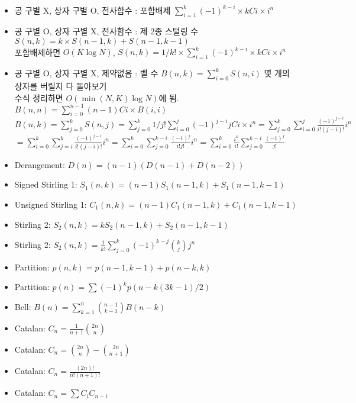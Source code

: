 \documentclass[landscape, 8pt, a4paper, oneside]{extarticle} %
\begin{document}
\begin{multicols*}{3}
\begin{itemize}
\item 공 구별 X, 상자 구별 O, 전사함수 : 포함배제 $\sum_{i=1}^{k} (-1)^{k-i} \times kCi \times i^n$
\item 공 구별 O, 상자 구별 X, 전사함수 : 제 2종 스털링 수 $S(n,k)=k\times S(n-1,k) + S(n-1, k-1)$\\
포함배제하면 $O(K \log N)$, $S(n,k) = 1/k! \times \sum_{i=1}^{k} (-1)^{k-i} \times kCi \times i^n$
\item 공 구별 O, 상자 구별 X, 제약없음 : 벨 수 $B(n,k) = \sum_{i=0}^{k} S(n,i)$ 몇 개의 상자를 버릴지 다 돌아보기\\
수식 정리하면 $O(\min(N,K)\log N)$에 됨. $B(n,n) = \sum_{i=0}^{n-1} (n-1)Ci \times B(i,i)$\\
$B(n,k)=\sum_{j=0}^{k}S(n,j) = \sum_{j=0}^{k} 1/j! \sum_{i=0}^{j} (-1)^{j-i} jCi \times i^n=\sum_{j=0}^{k}\sum_{i=0}^{j} \frac{(-1)^{j-i}}{i!(j-i)!}i^n$\\
$=\sum_{i=0}^{k}\sum_{j=i}^{k}\frac{(-1)^{j-i}}{i!(j-i)!}i^n = \sum_{i=0}^{k}\sum_{j=0}^{k-i}\frac{(-1)^j}{i!j!}i^n = \sum_{i=0}^k \frac{i^n}{i!}\sum_{j=0}^{k-i} \frac{(-1)^j}{j!}$

\item Derangement: $D(n)=(n-1)(D(n-1)+D(n-2))$
\item Signed Stirling 1: $S_1(n,k)=(n-1)S_1(n-1,k)+S_1(n-1,k-1)$
\item Unsigned Stirling 1: $C_1(n,k)=(n-1)C_1(n-1,k)+C_1(n-1,k-1)$
\item Stirling 2: $S_2(n,k)=kS_2(n-1,k)+S_2(n-1,k-1)$
\item Stirling 2: $S_2(n,k)=\frac{1}{k!}\sum_{j=0}^{k} (-1)^{k-j}{k \choose j}j^n$
\item Partition: $p(n,k)=p(n-1,k-1) + p(n-k,k)$
\item Partition: $p(n)=\sum (-1)^kp(n-k(3k-1)/2)$
\item Bell: $B(n)=\sum_{k=1}^n {n-1\choose k-1}B(n-k)$
\item Catalan: $C_n=\frac{1}{n+1}{2n\choose n}$
\item Catalan: $C_n={2n\choose n}-{2n\choose n+1}$
\item Catalan: $C_n=\frac{(2n)!}{n!(n+1)!}$
\item Catalan: $C_n=\sum C_iC_{n-i}$

\end{itemize}


\end{multicols*}
\end{document}
